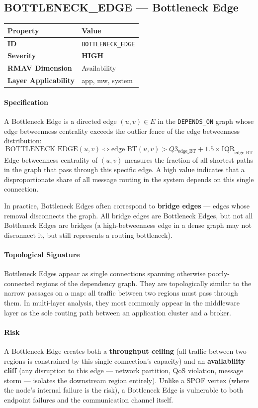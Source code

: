 \documentclass[11pt]{article}
\makeatletter
\newcommand{\HIGH}{\textcolor{orange!80!black}{\textbf{HIGH}}}
\newcommand{\patternprop}[4]{%
  \begin{center}
  \begin{tabular}{@{}ll@{}}
  \toprule
  \textbf{Property} & \textbf{Value} \\
  \midrule
  \textbf{ID} & \texttt{#1} \\
  \textbf{Severity} & #2 \\
  \textbf{RMAV Dimension} & #3 \\
  \textbf{Layer Applicability} & #4 \\
  \bottomrule
  \end{tabular}
  \end{center}
}
\makeatother
\begin{document}
\subsection{BOTTLENECK\_EDGE --- Bottleneck Edge}
\patternprop{BOTTLENECK\_EDGE}{\HIGH}{Availability}{app, mw, system}

\paragraph{Specification}
A Bottleneck Edge is a directed edge $(u,v) \in E$ in the \texttt{DEPENDS\_ON} graph whose edge betweenness centrality exceeds the outlier fence of the edge betweenness distribution:
\[
\mathrm{BOTTLENECK\_EDGE}(u,v) \Leftrightarrow \mathrm{edge\_BT}(u,v) > Q3_{\mathrm{edge\_BT}} + 1.5 \times \mathrm{IQR}_{\mathrm{edge\_BT}}
\]
Edge betweenness centrality of $(u,v)$ measures the fraction of all shortest paths in the graph that pass through this specific edge. A high value indicates that a disproportionate share of all message routing in the system depends on this single connection.

In practice, Bottleneck Edges often correspond to \textbf{bridge edges} --- edges whose removal disconnects the graph. All bridge edges are Bottleneck Edges, but not all Bottleneck Edges are bridges (a high-betweenness edge in a dense graph may not disconnect it, but still represents a routing bottleneck).

\paragraph{Topological Signature}
Bottleneck Edges appear as single connections spanning otherwise poorly-connected regions of the dependency graph. They are topologically similar to the narrow passages on a map: all traffic between two regions must pass through them. In multi-layer analysis, they most commonly appear in the middleware layer as the sole routing path between an application cluster and a broker.

\paragraph{Risk}
A Bottleneck Edge creates both a \textbf{throughput ceiling} (all traffic between two regions is constrained by this single connection's capacity) and an \textbf{availability cliff} (any disruption to this edge --- network partition, QoS violation, message storm --- isolates the downstream region entirely). Unlike a SPOF vertex (where the node's internal failure is the risk), a Bottleneck Edge is vulnerable to both endpoint failures and the communication channel itself.
\end{document}
